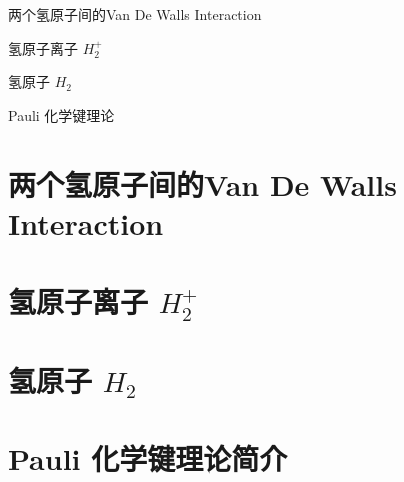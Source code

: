 \begin{introduction}
    \item 两个氢原子间的Van De Walls Interaction
    \item 氢原子离子 $H_2^+$
    \item 氢原子 $H_2$
    \item Pauli 化学键理论
\end{introduction}
 
 \section{两个氢原子间的Van De Walls Interaction}
 
 \section{氢原子离子 $H_2^+$}
 
 \section{氢原子 $H_2$}
 
 \section{Pauli 化学键理论简介}